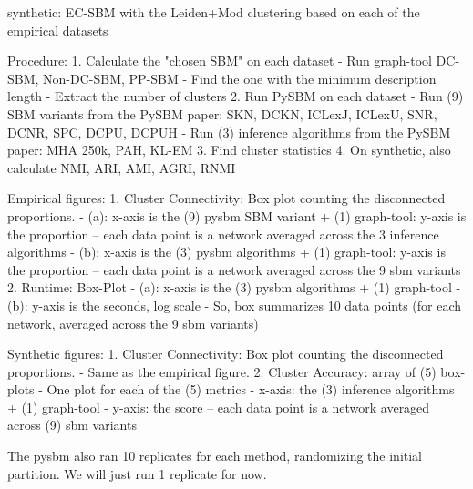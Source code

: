 \documentclass[aps,pre,superscriptaddress]{revtex4}
\begin{document}
synthetic: EC-SBM with the Leiden+Mod clustering based on each of the empirical datasets

Procedure:
1. Calculate the "chosen SBM" on each dataset
    - Run graph-tool DC-SBM, Non-DC-SBM, PP-SBM
    - Find the one with the minimum description length
    - Extract the number of clusters
2. Run PySBM on each dataset
    - Run (9) SBM variants from the PySBM paper: SKN, DCKN, ICLexJ, ICLexU, SNR, DCNR, SPC, DCPU, DCPUH
    - Run (3) inference algorithms from the PySBM paper: MHA 250k, PAH, KL-EM
3. Find cluster statistics
4. On synthetic, also calculate NMI, ARI, AMI, AGRI, RNMI

Empirical figures:
1. Cluster Connectivity: Box plot counting the disconnected proportions.
    - (a): x-axis is the (9) pysbm SBM variant + (1) graph-tool: y-axis is the proportion -- each data point is a network averaged across the 3 inference algorithms
    - (b): x-axis is the (3) pysbm algorithms + (1) graph-tool:  y-axis is the proportion -- each data point is a network averaged across the 9 sbm variants
2. Runtime: Box-Plot
    - (a): x-axis is the (3) pysbm algorithms + (1) graph-tool
    - (b): y-axis is the seconds, log scale
    - So, box summarizes 10 data points (for each network, averaged across the 9 sbm variants)

Synthetic figures:
1. Cluster Connectivity: Box plot counting the disconnected proportions.
    - Same as the empirical figure.
2. Cluster Accuracy: array of (5) box-plots
    - One plot for each of the (5) metrics
    - x-axis: the (3) inference algorithms  + (1) graph-tool
    - y-axis: the score -- each data point is a network averaged across (9) sbm variants

The pysbm also ran 10 replicates for each method, randomizing the initial partition.
We will just run 1 replicate for now.
\end{document}
